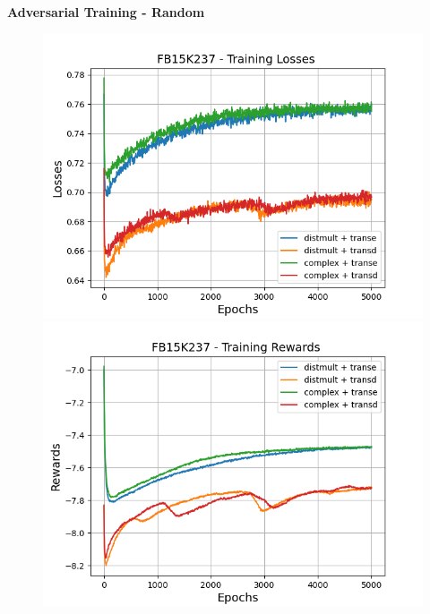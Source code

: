 \textbf{Adversarial Training - Random}\\
\begin{figure}
    \centering
    \begin{minipage}{.5\textwidth}
      \centering
      \includegraphics[width=0.9\linewidth]{figures/results/gan_train/pretrained/random/fb15k237/gan_train_random_fb15k237_losses.png}
    \end{minipage}%
    \begin{minipage}{.5\textwidth}
      \centering
      \includegraphics[width=0.9\linewidth]{figures/results/gan_train/pretrained/random/fb15k237/gan_train_random_fb15k237_rewards.png}
    \end{minipage}
    \begin{minipage}{.5\textwidth}
      \centering

\end{minipage}
\end{figure}
